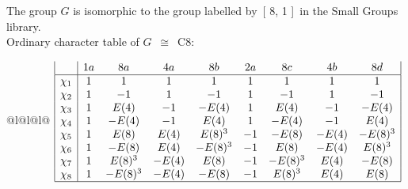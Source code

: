 \documentclass[varwidth=\maxdimen,border=10]{standalone}
\begin{document}
The group $G$ is isomorphic to the group labelled by\ [ 8, 1 ]\ in the Small Groups library.\\
Ordinary character table of $G$\ $\cong$\ C8:\\
\begin{center}
\begin{tabular}{@{}l@{}l@{}l@{}}
\hline
\(\begin{array}{|l|cccccccc|}
  & 1a & 8a & 4a & 8b & 2a & 8c & 4b & 8d\\ \hline
\chi_{1} & 1 & 1 & 1 & 1 & 1 & 1 & 1 & 1\\
\chi_{2} & 1 & -1 & 1 & -1 & 1 & -1 & 1 & -1\\
\chi_{3} & 1 & E(4) & -1 & -E(4) & 1 & E(4) & -1 & -E(4)\\
\chi_{4} & 1 & -E(4) & -1 & E(4) & 1 & -E(4) & -1 & E(4)\\
\chi_{5} & 1 & E(8) & E(4) & E(8)^{3} & -1 & -E(8) & -E(4) & -E(8)^{3}\\
\chi_{6} & 1 & -E(8) & E(4) & -E(8)^{3} & -1 & E(8) & -E(4) & E(8)^{3}\\
\chi_{7} & 1 & E(8)^{3} & -E(4) & E(8) & -1 & -E(8)^{3} & E(4) & -E(8)\\
\chi_{8} & 1 & -E(8)^{3} & -E(4) & -E(8) & -1 & E(8)^{3} & E(4) & E(8)\\
\hline
\end{array}\)\\
\end{tabular}
\end{center}
\end{document}
